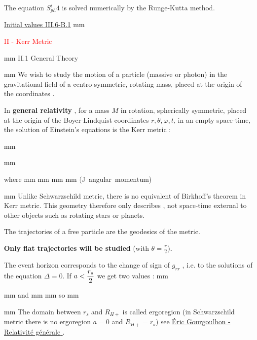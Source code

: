 \documentclass [12pt]{article}
\def\ph#1{\hskip #1}
\def\pv#1{\vskip #1}
\begin{document}
		 
	The equation $S^i_{ph}4$ is solved numerically by the Runge-Kutta method.  
	  
	   
	 \hyperlink{B1photon} {Initial values  III.6-B.1} 
	  	\pv 7mm
				
		    \hypertarget{ancre04}{ \centerline {\large\textcolor{red}{ II - Kerr Metric } }} \pv 2mm
      {\bidon II.1 General Theory}  
	 
       \pv 5mm    
       We wish to study the motion of a particle (massive or photon) in the gravitational field of a centro-symmetric, rotating mass,
        placed at the origin of the coordinates . 
	
		In  {\bf general relativity} , for a  mass $M$ in rotation, spherically symmetric, placed at the origin of the Boyer-Lindquist coordinates $r, \theta,\varphi ,t$, in an empty space-time, 		the solution of Einstein's equations is the  Kerr metric :
       
			\pv 5mm
	\centerline{ }
      \pv 5mm 
     
			\centerline {where \ph 5mm  \ph 5mm  \ph 5mm
			 \ph 5mm (J\ angular\  momentum)}
              

         \pv 3mm
          Unlike Schwarzschild metric, there is no equivalent of Birkhoff's theorem in Kerr metric. This geometry therefore only describes , not space-time
		  external to other objects such as rotating stars or planets.

         The trajectories of a free particle are the geodesics of the metric.   
				
				{\bf Only flat trajectories will be studied }  (with $\theta=\displaystyle\frac{\pi}{2}$).

			   The event horizon  corresponds to the change of sign of $g_{rr}$ , i.e. to the solutions of the equation $\Delta=0$. 	 
			If $\displaystyle a<{r_s\over 2}$ we get two values :
	\pv 2mm		
			\centerline{ \ph 3mm and \ph 3mm  
				\ph 3mm		so \ph 3mm  } 
			 \pv 5mm				
			  The domain between $r_s$ and $R_{H+}$ is called  ergoregion  (in Schwarzschild metric there is no ergoregion $a=0$ and   $R_{H+}=r_s$) see
			\href{documents/Extrait_Gourgoulhon_relatM2-page133.pdf }{\textcolor{bleu}{\'Eric Gourgoulhon - Relativit\'e g\'en\'erale} }  .
			
\end{document}
